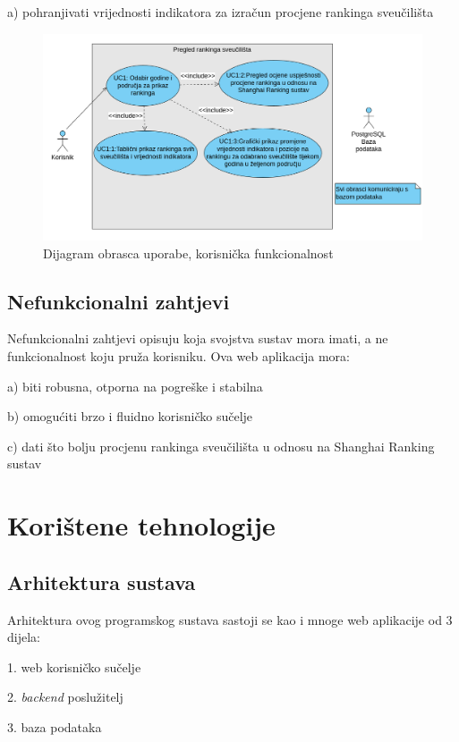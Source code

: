 \documentclass[times, utf8, zavrsni]{fer}
\begin{document}
a) pohranjivati vrijednosti indikatora za izračun procjene rankinga sveučilišta
\\
\begin{figure}[htb]
    
    \includegraphics[scale=0.4]{slika1.png}
    \caption{Dijagram obrasca uporabe, korisnička funkcionalnost}
    \label{fig:korisnik}
    \end{figure}
\newpage
\section{Nefunkcionalni zahtjevi}
Nefunkcionalni zahtjevi opisuju koja svojstva sustav mora imati, a ne funkcionalnost koju pruža korisniku. Ova web aplikacija mora:

a) biti robusna, otporna na pogreške i stabilna

b) omogućiti brzo i fluidno korisničko sučelje

c) dati što bolju procjenu rankinga sveučilišta u odnosu na Shanghai Ranking sustav

\chapter{Korištene tehnologije}
\section{Arhitektura sustava}
Arhitektura ovog programskog sustava sastoji se kao i mnoge web aplikacije od 3 dijela:

1. web korisničko sučelje

2. \emph{backend} poslužitelj

3. baza podataka
\end{document}
